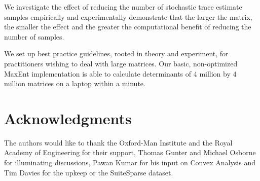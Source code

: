 \documentclass[journal]{IEEEtran}
\begin{document}
	We investigate the effect of reducing the number of stochastic trace estimate samples empirically and experimentally demonstrate that the larger the matrix, the smaller the effect and the greater the computational benefit of reducing the number of samples. 
	
	We set up best practice guidelines, rooted in theory and experiment, for practitioners wishing to deal with large matrices. Our basic, non-optimized MaxEnt implementation is able to calculate determinants of $4$ million by $4$ million matrices on a laptop within a minute.
	
	
	
	
	\section*{Acknowledgments}
	The authors would like to thank the Oxford-Man Institute and the Royal Academy of Engineering for their support, Thomas Gunter and Michael Osborne for illuminating discussions, Pawan Kumar for his input on Convex Analysis and Tim Davies for the upkeep or the SuiteSparse dataset.
	
	\ifCLASSOPTIONcaptionsoff
	\newpage
	\fi
	
\end{document}
